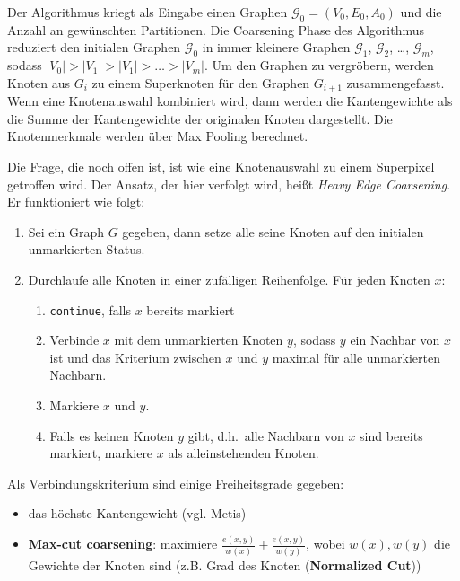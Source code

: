 \documentclass{scrartcl}
\begin{document}
Der Algorithmus kriegt als Eingabe einen Graphen $\mathcal{G}_0 = (V_0, E_0, A_0)$ und die Anzahl an gewünschten Partitionen.
Die Coarsening Phase des Algorithmus reduziert den initialen Graphen $\mathcal{G}_0$ in immer kleinere Graphen $\mathcal{G}_1$, $\mathcal{G}_2$, \ldots, $\mathcal{G}_m$, sodass $|V_0| > |V_1| > |V_1| > \ldots > |V_m|$.
Um den Graphen zu vergröbern, werden Knoten aus $G_i$ zu einem Superknoten für den Graphen $G_{i+1}$ zusammengefasst.
Wenn eine Knotenauswahl kombiniert wird, dann werden die Kantengewichte als die Summe der Kantengewichte der originalen Knoten dargestellt.
Die Knotenmerkmale werden über Max Pooling berechnet.

Die Frage, die noch offen ist, ist wie eine Knotenauswahl zu einem Superpixel getroffen wird.
Der Ansatz, der hier verfolgt wird, heißt \emph{Heavy Edge Coarsening}.
Er funktioniert wie folgt:

\begin{enumerate}
  \item Sei ein Graph $G$ gegeben, dann setze alle seine Knoten auf den initialen unmarkierten Status.
  \item Durchlaufe alle Knoten in einer zufälligen Reihenfolge. Für jeden Knoten $x$:
  \begin{enumerate}
      \item \texttt{continue}, falls $x$ bereits markiert
      \item Verbinde $x$ mit dem unmarkierten Knoten $y$, sodass $y$ ein Nachbar von $x$ ist und das Kriterium zwischen $x$ und $y$ maximal für alle unmarkierten Nachbarn.
      \item Markiere $x$ und $y$.
      \item Falls es keinen Knoten $y$ gibt, d.h.\ alle Nachbarn von $x$ sind bereits markiert, markiere $x$ als alleinstehenden Knoten.
    \end{enumerate}
\end{enumerate}

Als Verbindungskriterium sind einige Freiheitsgrade gegeben:

\begin{itemize}
  \item das höchste Kantengewicht (vgl. Metis)
  \item \textbf{Max-cut coarsening}: maximiere $\frac{e(x, y)}{w(x)} + \frac{e(x, y)}{w(y)}$, wobei $w(x), w(y)$ die Gewichte der Knoten sind (z.B. Grad des Knoten (\textbf{Normalized Cut}))
\end{itemize}
\end{document}
